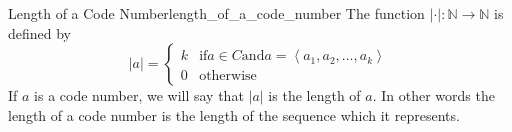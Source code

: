 \begin{definition}
{Length of a Code Number}{length_of_a_code_number}
The function \(|\cdot|: \mathbb{N} \rightarrow \mathbb{N}\) is defined by
\[
|a| =
\begin{cases}
k & \text {if} a \in C \text {and} a = \left\langle a_{1}, a_{2}, \ldots,
a_{k}\right\rangle \\
 0 & \text {otherwise}
\end{cases}
\]
If \(a\) is a code number, we will say that \(|a|\) is the length of \(a\). In
other words the length of a code number is the length of the sequence which it
represents.
\end{definition}
